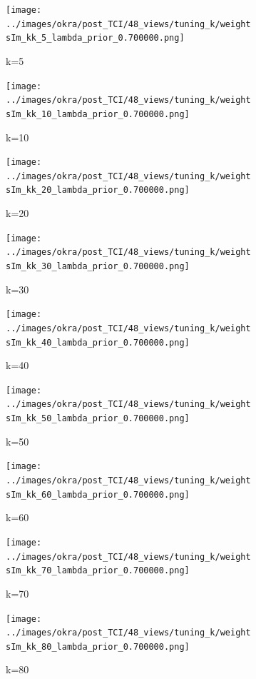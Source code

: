 \documentclass[journal]{IEEEtran}
\begin{document}
\begin{figure}[h]
    \begin{subfigure}[b]{0.24\linewidth}
        \texttt{[image: ../images/okra/post\_TCI/48\_views/tuning\_k/weightsIm\_kk\_5\_lambda\_prior\_0.700000.png]}
        \caption{k=5}
     \end{subfigure}     
  \begin{subfigure}[b]{0.24\linewidth}
        \texttt{[image: ../images/okra/post\_TCI/48\_views/tuning\_k/weightsIm\_kk\_10\_lambda\_prior\_0.700000.png]}
        \caption{k=10}
     \end{subfigure} 
  \begin{subfigure}[b]{0.24\linewidth}
        \texttt{[image: ../images/okra/post\_TCI/48\_views/tuning\_k/weightsIm\_kk\_20\_lambda\_prior\_0.700000.png]}
        \caption{k=20}
     \end{subfigure}
  \begin{subfigure}[b]{0.24\linewidth}
        \texttt{[image: ../images/okra/post\_TCI/48\_views/tuning\_k/weightsIm\_kk\_30\_lambda\_prior\_0.700000.png]}
        \caption{k=30}
     \end{subfigure}
  \begin{subfigure}[b]{0.24\linewidth}
        \texttt{[image: ../images/okra/post\_TCI/48\_views/tuning\_k/weightsIm\_kk\_40\_lambda\_prior\_0.700000.png]}
        \caption{k=40}
     \end{subfigure}
  \begin{subfigure}[b]{0.24\linewidth}
        \texttt{[image: ../images/okra/post\_TCI/48\_views/tuning\_k/weightsIm\_kk\_50\_lambda\_prior\_0.700000.png]}
        \caption{k=50}
     \end{subfigure}
   \begin{subfigure}[b]{0.24\linewidth}
        \texttt{[image: ../images/okra/post\_TCI/48\_views/tuning\_k/weightsIm\_kk\_60\_lambda\_prior\_0.700000.png]}
        \caption{k=60}
     \end{subfigure}
   \begin{subfigure}[b]{0.24\linewidth}
        \texttt{[image: ../images/okra/post\_TCI/48\_views/tuning\_k/weightsIm\_kk\_70\_lambda\_prior\_0.700000.png]}
        \caption{k=70}
     \end{subfigure}
  \begin{subfigure}[b]{0.24\linewidth}
        \texttt{[image: ../images/okra/post\_TCI/48\_views/tuning\_k/weightsIm\_kk\_80\_lambda\_prior\_0.700000.png]}
        \caption{k=80}
     \end{subfigure}
   \begin{subfigure}[b]{0.24\linewidth}

\end{subfigure}
\end{figure}
\end{document}
